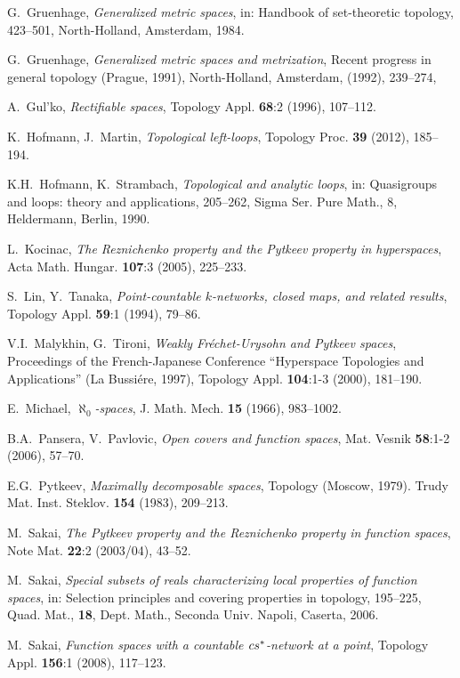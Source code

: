 \documentclass{amsart}
\theoremstyle{definition}
\begin{document}
\begin{thebibliography}{}
 G.~Gruenhage, {\em Generalized metric spaces}, in: Handbook of set-theoretic topology, 423--501, North-Holland, Amsterdam, 1984.

 G.~Gruenhage, {\em Generalized metric spaces and metrization}, Recent progress in general topology (Prague, 1991),  North-Holland, Amsterdam, (1992), 239--274,

 A.~Gul'ko, {\em Rectifiable spaces}, Topology Appl. {\bf 68}:2 (1996), 107--112.

 K.~Hofmann, J.~Martin, {\em Topological left-loops}, Topology Proc. {\bf 39} (2012), 185--194.

 K.H.~Hofmann, K.~Strambach, {\em Topological and analytic loops}, in: Quasigroups and loops: theory and applications, 205--262, Sigma Ser. Pure Math., 8, Heldermann, Berlin, 1990.

 L.~Kocinac, {\em The Reznichenko property and the Pytkeev property in hyperspaces},
Acta Math. Hungar. {\bf 107}:3 (2005), 225--233.

 S.~Lin, Y.~Tanaka, {\em Point-countable $k$-networks, closed maps, and related results},  Topology Appl. {\bf 59}:1 (1994), 79--86.

 V.I.~Malykhin, G.~Tironi, {\em Weakly Fr\'echet-Urysohn and Pytkeev spaces},
Proceedings of the French-Japanese Conference ``Hyperspace Topologies and Applications'' (La Bussi\'ere, 1997), Topology Appl. {\bf 104}:1-3 (2000), 181--190.

 E.~Michael, {\em $\aleph_0$-spaces}, J. Math. Mech. {\bf 15} (1966), 983--1002.

 B.A.~Pansera, V.~Pavlovic, {\em Open covers and function spaces},
Mat. Vesnik {\bf 58}:1-2 (2006), 57--70.

 E.G.~Pytkeev, {\em Maximally decomposable spaces}, Topology (Moscow, 1979). Trudy Mat. Inst. Steklov. {\bf 154} (1983), 209--213.

 M.~Sakai, {\em The Pytkeev property and the Reznichenko property in function spaces},
Note Mat. {\bf 22}:2 (2003/04), 43--52.

 M.~Sakai, {\em Special subsets of reals characterizing local properties of function spaces}, in: Selection principles and covering properties in topology, 195--225, Quad. Mat., {\bf 18}, Dept. Math., Seconda Univ. Napoli, Caserta, 2006.

 M.~Sakai, {\em Function spaces with a countable $cs\sp *$-network at a point}, Topology Appl. {\bf 156}:1 (2008), 117--123.


\end{thebibliography}
\end{document}
